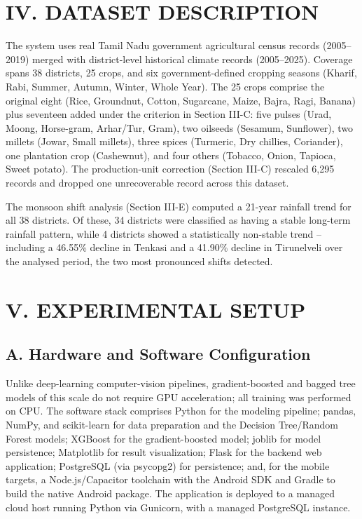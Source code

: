 \documentclass[12pt,a4paper,twocolumn]{article}
\begin{document}
\section*{IV. DATASET DESCRIPTION}

The system uses real Tamil Nadu government agricultural census records (2005--2019)
merged with district-level historical climate records (2005--2025). Coverage spans
38 districts, 25 crops, and six government-defined cropping seasons (Kharif, Rabi,
Summer, Autumn, Winter, Whole Year). The 25 crops comprise the original eight (Rice,
Groundnut, Cotton, Sugarcane, Maize, Bajra, Ragi, Banana) plus seventeen added under
the criterion in Section III-C: five pulses (Urad, Moong, Horse-gram, Arhar/Tur,
Gram), two oilseeds (Sesamum, Sunflower), two millets (Jowar, Small millets), three
spices (Turmeric, Dry chillies, Coriander), one plantation crop (Cashewnut), and four
others (Tobacco, Onion, Tapioca, Sweet potato). The production-unit correction
(Section III-C) rescaled 6,295 records and dropped one unrecoverable record across
this dataset.

The monsoon shift analysis (Section III-E) computed a 21-year rainfall trend for all
38 districts. Of these, 34 districts were classified as having a stable long-term
rainfall pattern, while 4 districts showed a statistically non-stable trend --
including a 46.55\% decline in Tenkasi and a 41.90\% decline in Tirunelveli over the
analysed period, the two most pronounced shifts detected.

\section*{V. EXPERIMENTAL SETUP}

\subsection*{A. Hardware and Software Configuration}

Unlike deep-learning computer-vision pipelines, gradient-boosted and bagged tree
models of this scale do not require GPU acceleration; all training was performed on
CPU. The software stack comprises Python for the modeling pipeline; pandas, NumPy,
and scikit-learn for data preparation and the Decision Tree/Random Forest models;
XGBoost for the gradient-boosted model; joblib for model persistence; Matplotlib for
result visualization; Flask for the backend web application; PostgreSQL (via
psycopg2) for persistence; and, for the mobile targets, a Node.js/Capacitor toolchain
with the Android SDK and Gradle to build the native Android package. The application
is deployed to a managed cloud host running Python via Gunicorn, with a managed
PostgreSQL instance.
\end{document}
